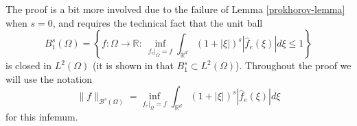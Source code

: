The proof is a bit more involved due to the failure of Lemma \ref{prokhorov-lemma} when $s=0$, and requires the technical fact that the unit ball
\begin{equation}
 B_1^s(\Omega) = \left\{f:\Omega\rightarrow \mathbb{R}:~\inf_{f_e|_\Omega = f} \int_{\mathbb{R}^d} (1+|\xi|)^s|\hat{f}_e(\xi)|d\xi\leq 1\right\}
\end{equation}
is closed in $L^2(\Omega)$ (it is shown in \cite{siegel2020approximation} that $B_1^s\subset L^2(\Omega)$). Throughout the proof we will use the notation
\begin{equation}\label{spectral-barron-integral-condition}
 \|f\|_{\mathcal{B}^s(\Omega)} = \inf_{f_e|_\Omega = f} \int_{\mathbb{R}^d} (1+|\xi|)^s|\hat{f}_e(\xi)|d\xi
\end{equation}
for this infemum.

